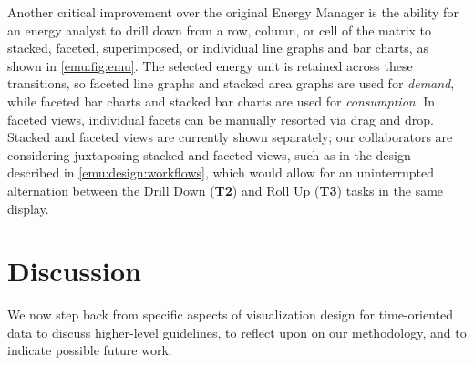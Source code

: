  Another critical improvement over the original Energy Manager is the ability for an energy analyst to drill down from a row, column, or cell of the matrix to stacked, faceted, superimposed, or individual line graphs and bar charts, as shown in \autoref{emu:fig:emu}.
The selected energy unit is retained across these transitions, so faceted line graphs and stacked area graphs are used for {\it demand}, while faceted bar charts and stacked bar charts are used for {\it consumption}.
In faceted views, individual facets can be manually resorted via drag and drop.
Stacked and faceted views are currently shown separately; our collaborators are considering juxtaposing stacked and faceted views, such as in the design described in \autoref{emu:design:workflows}, which would allow for an uninterrupted alternation between the Drill Down ({\bf T2}) and Roll Up ({\bf T3}) tasks in the same display.


\section{Discussion}
\label{emu:discussion}


\begin{sloppypar}
We now step back from specific aspects of visualization design for time-oriented data to discuss higher-level guidelines, to reflect upon on our methodology, and to indicate possible future work.
\end{sloppypar}

